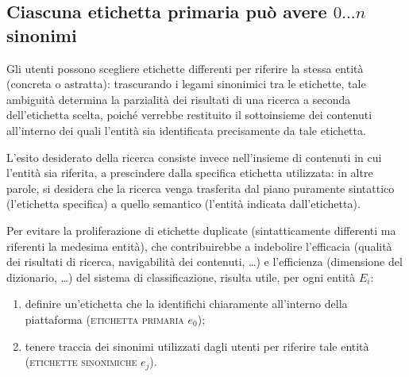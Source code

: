 \documentclass[10pt,a4paper,headinclude,footinclude,hidelinks]{scrreprt} %
\begin{document}
	\subsection[Sinonimi]{Ciascuna etichetta primaria può avere $0...n$ sinonimi}
	Gli utenti possono scegliere etichette differenti per riferire la stessa entità (concreta o astratta): trascurando i legami sinonimici tra le etichette, tale ambiguità determina la parzialità dei risultati di una ricerca a seconda dell'etichetta scelta, poiché verrebbe restituito il sottoinsieme dei contenuti all'interno dei quali l'entità sia identificata precisamente da tale etichetta.
	

	L'esito desiderato della ricerca consiste invece nell'insieme di contenuti in cui l'entità sia riferita, a prescindere dalla specifica etichetta utilizzata: in altre parole, si desidera che la ricerca venga trasferita dal piano puramente sintattico (l'etichetta specifica) a quello semantico (l'entità indicata dall'etichetta).

	Per evitare la proliferazione di etichette duplicate (sintatticamente differenti ma riferenti la medesima entità), che contribuirebbe a indebolire l'efficacia (qualità dei risultati di ricerca, navigabilità dei contenuti, \ldots) e l'efficienza (dimensione del dizionario, \ldots) del sistema di classificazione, risulta utile, per ogni entità $E_i$:
	\begin{enumerate}
	\item definire un'etichetta che la identifichi chiaramente all'interno della piattaforma (\textsc{etichetta primaria} $e_0$);
	\item tenere traccia dei sinonimi utilizzati dagli utenti per riferire tale entità (\textsc{etichette sinonimiche} $e_j$).
	\end{enumerate}

\end{document}

